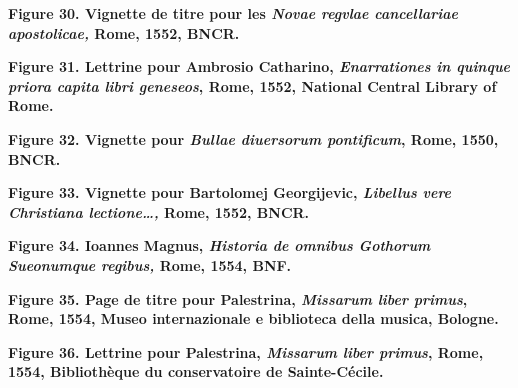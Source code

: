 \documentclass[12pt,twoside,openany]{book}
\begin{document}
\begin{center}
\par\small \textbf{Figure 30. Vignette de titre pour les \textit{Novae regvlae cancellariae apostolicae, }Rome, 1552, BNCR.}
\end{center}

\begin{center}
\par\small \textbf{Figure 31. Lettrine pour Ambrosio Catharino, \textit{Enarrationes in quinque priora capita libri geneseos}, Rome, 1552, National Central Library of Rome.}
\end{center}

\begin{center}
\par\small \textbf{Figure 32. Vignette pour \textit{Bullae diuersorum pontificum}, Rome, 1550, BNCR.}
\end{center}

\begin{center}
\par\small \textbf{Figure 33. Vignette pour Bartolomej Georgijevic, \textit{Libellus vere Christiana lectione…, }Rome, 1552, BNCR.}
\end{center}

\begin{center}
\par\small \textbf{Figure 34. Ioannes Magnus, \textit{Historia de omnibus Gothorum Sueonumque regibus,} Rome, 1554, BNF.}
\end{center}

\begin{center}
\par\small \textbf{Figure 35. Page de titre pour Palestrina, \textit{Missarum liber primus}, Rome, 1554, Museo internazionale e biblioteca della musica, Bologne.}
\end{center}

\begin{center}
\par\small \textbf{Figure 36. Lettrine pour Palestrina, \textit{Missarum liber primus}, Rome, 1554, Bibliothèque du conservatoire de Sainte-Cécile.}
\end{center}
\end{document}

